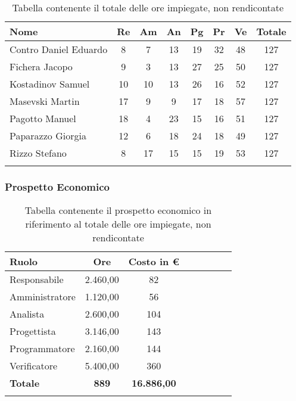 \documentclass[../piano_di_progetto.tex]{subfiles}
\begin{document}
\begin{center}
	\begin{longtable}{|l|c|c|c|c|c|c|c|}
		\hline
		\rowcolor{lightgray}
		\textbf{Nome} & \textbf{Re} & \textbf{Am} & \textbf{An} & \textbf{Pg}  & \textbf{Pr}   & \textbf{Ve} & \textbf{Totale} \\

		\hline
			Contro Daniel Eduardo & 8 & 7 & 13 & 19 & 32 & 48 & 127 \\
		\hline
			Fichera Jacopo & 9 & 3 & 13 & 27 & 25 & 50 & 127 \\
		\hline
			Kostadinov Samuel & 10 & 10 & 13 & 26 & 16 & 52 & 127 \\			
		\hline
			Masevski Martin & 17 & 9 & 9 & 17 & 18 & 57 & 127 \\
		\hline
			Pagotto Manuel & 18 & 4 & 23 & 15 & 16 & 51 & 127 \\			
		\hline
			Paparazzo Giorgia & 12 & 6 & 18 & 24 & 18 & 49 & 127 \\
		\hline
			Rizzo Stefano & 8 & 17 & 15 & 15 & 19 & 53 & 127 \\
		\hline	

		\caption{Tabella contenente il totale delle ore impiegate, non rendicontate}
	\end{longtable}
\end{center}

\subsubsection{Prospetto Economico}

\begin{center}
	\begin{longtable}{|l|c|c|c|c|c|c|c|}
		\hline
		\rowcolor{lightgray}
		\textbf{Ruolo} & \textbf{Ore} & \textbf{Costo in €}\\

		\hline
		Responsabile & 2.460,00 & 82 \\
		\hline
		Amministratore & 1.120,00 & 56 \\
		\hline
		Analista & 2.600,00 & 104 \\
		\hline
		Progettista & 3.146,00 & 143 \\
		\hline
		Programmatore & 2.160,00 & 144 \\
		\hline
		Verificatore & 5.400,00 & 360 \\
		\hline
		\textbf{Totale} & \textbf{889} & \textbf{16.886,00}\\
		\hline
		\caption{Tabella contenente il prospetto economico in riferimento al totale delle ore impiegate, non rendicontate}
	\end{longtable}
\end{center}
\end{document}
